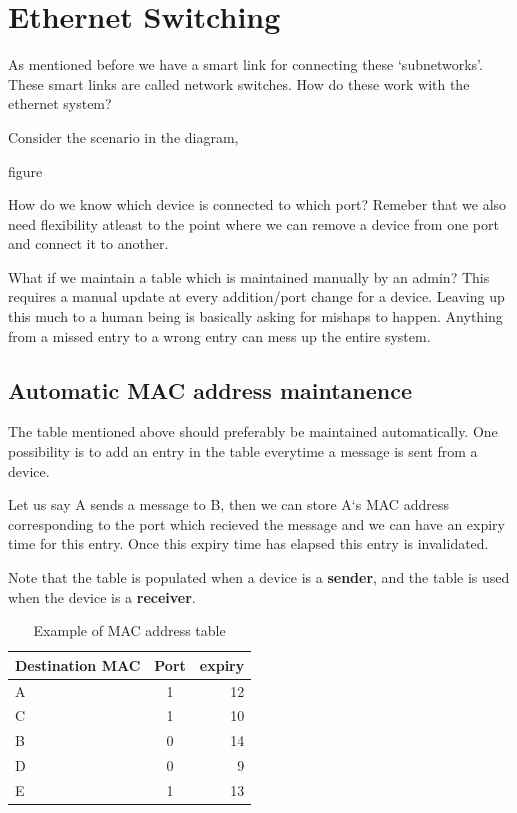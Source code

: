 \documentclass[12pt]{article}
\begin{document}
\section{Ethernet Switching}

As mentioned before we have a smart link for connecting these `subnetworks'. These smart links 
are called network switches. How do these work with the ethernet system? 

Consider the scenario in the diagram,

figure

How do we know which device is connected to which port? Remeber that we also 
need flexibility atleast to the point where we can remove a device from one port and connect it to another. 

What if we maintain a table which is maintained manually by an admin? This requires a manual 
update at every addition/port change for a device. Leaving up this much to a human being is basically asking for 
mishaps to happen. Anything from a missed entry to a wrong entry can mess up the entire system. 

\subsection{Automatic MAC address maintanence}
The table mentioned above should preferably be maintained automatically. One possibility is to 
add an entry in the table everytime a message is sent from a device. 

Let us say A sends a message to B, then we can store A`s MAC address corresponding to the port which recieved the message and 
we can have an expiry time for this entry. Once this expiry time has elapsed this entry is invalidated. 

Note that the table is populated when a device is a \textbf{sender}, and the table is used when the device is a 
\textbf{receiver}. 

\begin{table}[h!]
    \centering
    \begin{tabular}{l c r}
    \toprule
    Destination MAC & Port & expiry \\
    \midrule
    A & 1 & 12   \\
    C & 1 & 10 \\
    B & 0 & 14 \\
    D & 0 & 9 \\
    E & 1 & 13 \\
    \bottomrule
    \end{tabular}
    \caption{Example of MAC address table}
\end{table}
    
\end{document}
